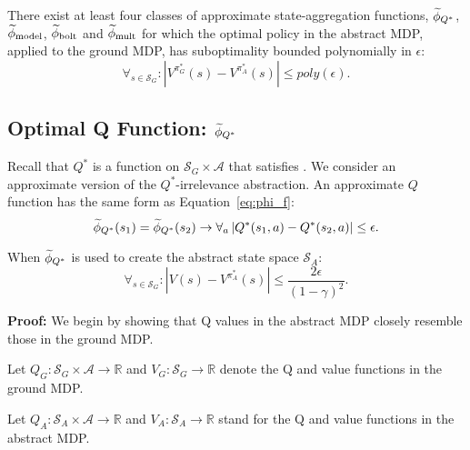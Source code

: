 \begin{thm}
There exist at least four classes of approximate state-aggregation functions, $\widetilde \phi_{Q^*}$, $\widetilde \phi_{\text{model}}$, $\widetilde \phi_{\text{bolt}}$ and $\widetilde \phi_{\text{mult}}$ for which the optimal policy in the abstract \ac{MDP}, applied to the ground \ac{MDP}, has suboptimality bounded polynomially in $\epsilon$:
\begin{equation}
\forall_{s \in \mathcal{S}_G}: | V^{\pi^*_G}(s) - V^{\pi^*_{A}}(s) | \leq poly(\epsilon).
\end{equation}

\end{thm}


\subsection{Optimal Q Function: $\widetilde \phi_{Q^*}$}

Recall that $Q^*$ is a function on $\mathcal{S}_G \times \mathcal{A}$ that satisfies . We consider an approximate version of the $Q^*$-irrelevance abstraction. An approximate $Q$ function has the same form as Equation~\ref{eq:phi_f}:
\begin{equation}
\widetilde \phi_{Q^*}(s_1) = \widetilde \phi_{Q^*}(s_2) \rightarrow \forall_a \left|Q^*(s_1, a) - Q^*(s_2, a)\right| \leq \epsilon.
\end{equation}

\begin{lma}
\label{lma:Q*}
When $\widetilde \phi_{Q^*}$ is used to create the abstract state space $\mathcal{S}_A$:
\begin{equation}
\forall_{s \in \mathcal{S}_G}: | V(s) - V^{\pi^*_{A}}(s) | \leq \frac{2\epsilon}{(1-\gamma)^2}.
\end{equation}
\end{lma}

\textbf{Proof:}
We begin by showing that Q values in the abstract \ac{MDP} closely resemble those in the ground \ac{MDP}.

Let $Q_G: \mathcal{S}_G \times \mathcal{A} \rightarrow \mathbb{R}$ and $V_G: \mathcal{S}_G \rightarrow \mathbb{R}$ denote the Q and value functions in the ground \ac{MDP}.

Let $Q_A: \mathcal{S}_A \times \mathcal{A} \rightarrow \mathbb{R}$ and $V_A: \mathcal{S}_A \rightarrow \mathbb{R}$  stand for the Q and value functions in the abstract \ac{MDP}.


